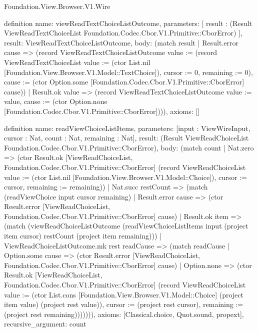 \begin{lexlean}{Foundation.View.Browser.V1.Wire}
\begin{semanticmodule}
definition{
  name: viewReadTextChoiceListOutcome,
  parameters: [
    result : (Result ViewReadTextChoiceList Foundation.Codec.Cbor.V1.Primitive::CborError)
  ],
  result: ViewReadTextChoiceListOutcome,
  body: (match result
    | Result.error cause => (record ViewReadTextChoiceListOutcome {value := (record ViewReadTextChoiceList {value := (ctor List.nil [Foundation.View.Browser.V1.Model::TextChoice]), cursor := 0, remaining := 0}), cause := (ctor Option.some [Foundation.Codec.Cbor.V1.Primitive::CborError] cause)})
    | Result.ok value => (record ViewReadTextChoiceListOutcome {value := value, cause := (ctor Option.none [Foundation.Codec.Cbor.V1.Primitive::CborError])})),
  axioms: []
}

definition{
  name: readViewChoiceListItems,
  parameters: [input : ViewWireInput, cursor : Nat, count : Nat, remaining : Nat],
  result: (Result ViewReadChoiceList Foundation.Codec.Cbor.V1.Primitive::CborError),
  body: (match count
    | Nat.zero => (ctor Result.ok [ViewReadChoiceList, Foundation.Codec.Cbor.V1.Primitive::CborError] (record ViewReadChoiceList {value := (ctor List.nil [Foundation.View.Browser.V1.Model::Choice]), cursor := cursor, remaining := remaining}))
    | Nat.succ restCount => (match (readViewChoice input cursor remaining)
      | Result.error cause => (ctor Result.error [ViewReadChoiceList, Foundation.Codec.Cbor.V1.Primitive::CborError] cause)
      | Result.ok item => (match (viewReadChoiceListOutcome (readViewChoiceListItems input (project item cursor) restCount (project item remaining)))
        | ViewReadChoiceListOutcome.mk rest readCause => (match readCause
          | Option.some cause => (ctor Result.error [ViewReadChoiceList, Foundation.Codec.Cbor.V1.Primitive::CborError] cause)
          | Option.none => (ctor Result.ok [ViewReadChoiceList, Foundation.Codec.Cbor.V1.Primitive::CborError] (record ViewReadChoiceList {value := (ctor List.cons [Foundation.View.Browser.V1.Model::Choice] (project item value) (project rest value)), cursor := (project rest cursor), remaining := (project rest remaining)})))))),
  axioms: [Classical.choice, Quot.sound, propext],
  recursive_argument: count
}


\end{semanticmodule}
\end{lexlean}
